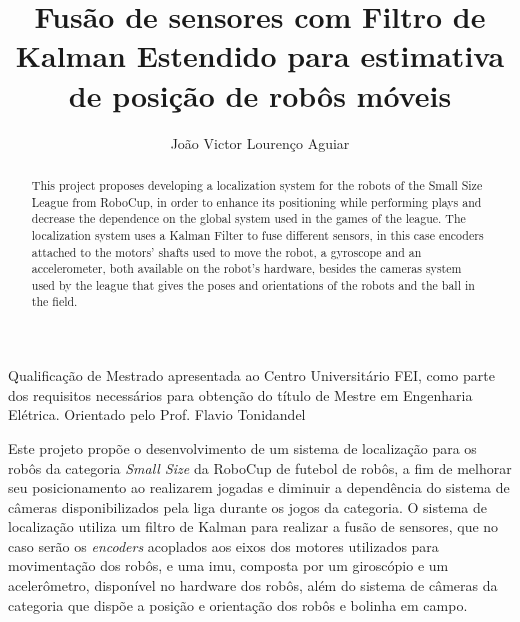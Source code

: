 \documentclass[acronym, symbols, table]{fei}
\title{Fusão de sensores com Filtro de Kalman Estendido para estimativa de posição de robôs móveis}
\author{João Victor Lourenço Aguiar}
\begin{document}
	
\maketitle

\begin{folhaderosto}
	Qualificação de Mestrado apresentada ao Centro Universitário FEI, como parte dos requisitos necessários para obtenção do título de Mestre em Engenharia Elétrica. Orientado pelo Prof. Flavio Tonidandel
\end{folhaderosto}
	
\begin{resumo}

	Este projeto propõe o desenvolvimento de um sistema de localização para os robôs da categoria \textit{Small Size} da RoboCup de futebol de robôs, a fim de melhorar seu posicionamento ao realizarem jogadas e diminuir a dependência do sistema de câmeras disponibilizados pela liga durante os jogos da categoria. O sistema de localização utiliza um filtro de Kalman para realizar a fusão de sensores, que no caso serão os \textit{encoders} acoplados aos eixos dos motores utilizados para movimentação dos robôs, e uma \acrshort{imu}, composta por um giroscópio e um acelerômetro, disponível no hardware dos robôs, além do sistema de câmeras da categoria que dispõe a posição e orientação dos robôs e bolinha em campo.
	

\end{resumo}

\begin{abstract}
	
	This project proposes developing a localization system for the robots of the Small Size League from RoboCup, in order to enhance its positioning while performing plays and decrease the dependence on the global system used in the games of the league. The localization system uses a Kalman Filter to fuse different sensors, in this case encoders attached to the motors' shafts used to move the robot, a gyroscope and an accelerometer, both available on the robot's hardware, besides the cameras system used by the league that gives the poses and orientations of the robots and the ball in the field.
	
	
\end{abstract}

\listoffigures
\listoftables
\listofalgorithms
\printglossaries
\tableofcontents
\setcounter{table}{0}
\end{document}
